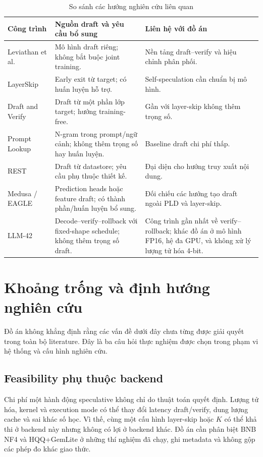 \begin{table}[H]
\centering
\caption{So sánh các hướng nghiên cứu liên quan}\label{tab:related-work-comparison}
\begin{tabularx}{\textwidth}{@{}>{\raggedright\arraybackslash}p{3.5cm}>{\raggedright\arraybackslash}p{5.5cm}>{\raggedright\arraybackslash}X@{}}
\toprule
\textbf{Công trình} & \textbf{Nguồn draft và yêu cầu bổ sung} & \textbf{Liên hệ với đồ án} \\
\midrule
Leviathan et al.~\cite{leviathan2023fast} & Mô hình draft riêng; không bắt buộc joint training. & Nền tảng draft--verify và hiệu chỉnh phân phối. \\
LayerSkip~\cite{elhoushi2024layerskip} & Early exit từ target; có huấn luyện hỗ trợ. & Self-speculation cần chuẩn bị mô hình. \\
Draft and Verify~\cite{zhang2024draft} & Draft từ một phần lớp target; hướng training-free. & Gần với layer-skip không thêm trọng số. \\
Prompt Lookup~\cite{saxena2024promptlookup} & N-gram trong prompt/ngữ cảnh; không thêm trọng số hay huấn luyện. & Baseline draft chi phí thấp. \\
REST~\cite{he2024rest} & Draft từ datastore; yêu cầu phụ thuộc thiết kế. & Đại diện cho hướng truy xuất nội dung. \\
Medusa / EAGLE~\cite{cai2024medusa,li2024eagle} & Prediction heads hoặc feature draft; có thành phần/huấn luyện bổ sung. & Đối chiếu các hướng tạo draft ngoài PLD và layer-skip. \\
LLM-42~\cite{gond2026llm42} & Decode--verify--rollback với fixed-shape schedule; không thêm trọng số draft. & Công trình gần nhất về verify--rollback; khác đồ án ở mô hình FP16, hệ đa GPU, và không xử lý lượng tử hóa 4-bit. \\
\bottomrule
\end{tabularx}
\end{table}

\section{Khoảng trống và định hướng nghiên cứu}
Đồ án không khẳng định rằng các vấn đề dưới đây chưa từng được giải quyết trong toàn bộ literature. Đây là ba câu hỏi thực nghiệm được chọn trong phạm vi hệ thống và cấu hình nghiên cứu.

\subsection{Feasibility phụ thuộc backend}
Chi phí một hành động speculative không chỉ do thuật toán quyết định. Lượng tử hóa, kernel và execution mode có thể thay đổi latency draft/verify, dung lượng cache và sai khác số học. Vì thế, cùng một cấu hình layer-skip hoặc $K$ có thể khả thi ở backend này nhưng không có lợi ở backend khác. Đồ án cần phân biệt BNB NF4 và HQQ+GemLite ở những thí nghiệm đã chạy, ghi metadata và không gộp các phép đo khác giao thức.

